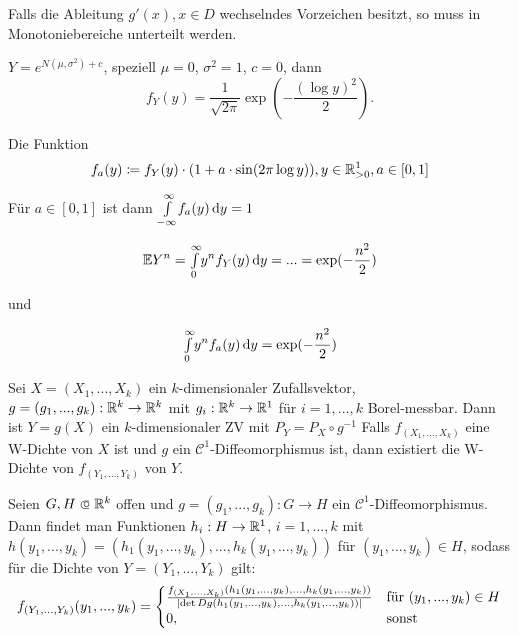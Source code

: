 \documentclass{cheat-sheet}
\newcommand{\E}{\mathbb{E}} %
\begin{document}

\begin{bem}
  Falls die Ableitung $g'(x), x \in D$ wechselndes Vorzeichen besitzt, so muss in Monotoniebereiche unterteilt werden.
\end{bem}

\begin{bsp}
  $Y = e^{N(\mu, \sigma^2) + c}$, speziell $\mu = 0$, $\sigma^2 = 1$, $c = 0$, dann
  \[ f_Y(y) = \frac{1}{\sqrt{2 \pi}} \exp(- \frac{(\log y)^2}{2}). \]
\end{bsp}


Die Funktion
\[ f_a(y) \coloneqq f_Y(y) \cdot (1 + a \cdot \sin(2 \pi \log y)), y \in \mathbb{R}_{>0}^1, a \in [0,1] \]

Für $a \in [0,1]$ ist dann ${\textstyle \int\limits_{-\infty}^{\infty}} f_a(y) \,\mathrm{d} y = 1$

\[ \E Y^n = \Int{0}{\infty}{y^n f_Y(y)}{y} = ... = \exp(- \frac{n^2}{2}) \]

und

\[ {\textstyle \int\limits_{0}^{\infty}} y^n f_a(y) \,\mathrm{d} y = \exp(- \frac{n^2}{2}) \]



Sei $X = (X_1, ..., X_k)$ ein $k$-dimensionaler Zufallsvektor,
$g = (g_1, ..., g_k) : \mathbb{R}^k \to \mathbb{R}^k$ mit $g_i : \mathbb{R}^k \to \mathbb{R}^1$ für $i = 1, ..., k$ Borel-messbar.
Dann ist $Y = g(X)$ ein $k$-dimensionaler ZV mit $P_Y = P_X \circ g^{-1}$
Falls $f_{(X_1, ..., X_k)}$ eine W-Dichte von $X$ ist und $g$ ein $\mathcal{C}^1$-Diffeomorphismus ist, dann existiert die W-Dichte von $f_{(Y_1, ..., Y_k)}$ von $Y$.

\begin{satz}
  Seien $G, H \opn \R^k$ offen und $g = (g_1, ..., g_k) : G \to H$ ein $\mathcal{C}^1$-Diffeomorphismus.
  Dann findet man Funktionen $h_i : H \to \mathbb{R}^1$, $i = 1, ..., k$ mit $h(y_1, ..., y_k) = (h_1(y_1, ..., y_k), ..., h_k(y_1, ..., y_k))$ für $(y_1, ..., y_k) \in H$, sodass für die Dichte von $Y = (Y_1, ..., Y_k)$ gilt:
  \[ f_{(Y_1, ..., Y_k)}(y_1, ..., y_k) = \begin{cases} \frac{f_{(X_1, ..., X_k)}(h_1(y_1, ..., y_k), ..., h_k(y_1, ..., y_k))}{\lvert\det D g(h_1(y_1, ..., y_k), ..., h_k(y_1, ..., y_k))\rvert} & \text{für $(y_1, ..., y_k) \in H$} \\ 0, & \text{sonst} \end{cases} \]
\end{satz}
\end{document}
